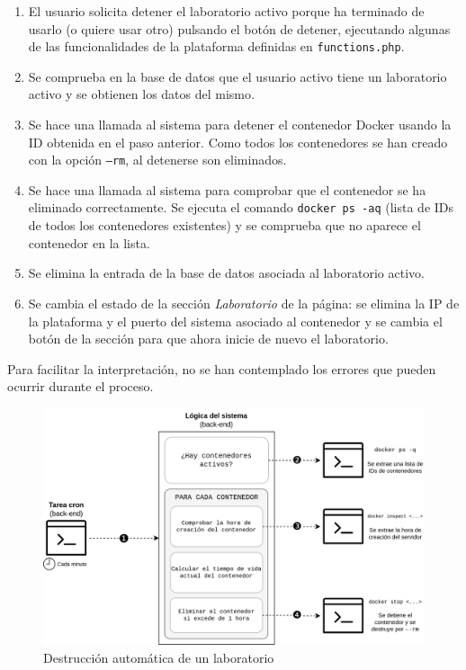             \begin{enumerate}
                \item El usuario solicita detener el laboratorio activo porque ha terminado de usarlo (o quiere usar otro) pulsando el botón de detener, ejecutando algunas de las funcionalidades de la plataforma definidas en \texttt{functions.php}.

                \item Se comprueba en la base de datos que el usuario activo tiene un laboratorio activo y se obtienen los datos del mismo.

                \item Se hace una llamada al sistema para detener el contenedor Docker usando la ID obtenida en el paso anterior. Como todos los contenedores se han creado con la opción \texttt{--rm}, al detenerse son eliminados.

                \item Se hace una llamada al sistema para comprobar que el contenedor se ha eliminado correctamente. Se ejecuta el comando \texttt{docker ps -aq} (lista de IDs de todos los contenedores existentes) y se comprueba que no aparece el contenedor en la lista.
                
                \item Se elimina la entrada de la base de datos asociada al laboratorio activo.

                \item Se cambia el estado de la sección \textit{Laboratorio} de la página: se elimina la IP de la plataforma y el puerto del sistema asociado al contenedor y se cambia el botón de la sección para que ahora inicie de nuevo el laboratorio.
                
            \end{enumerate}

            Para facilitar la interpretación, no se han contemplado los errores que pueden ocurrir durante el proceso.

            \newpage


            \begin{figure}
                \centering

                \includegraphics[scale=0.15]{images/Diagramas/detener-cron.png}
                \caption{Destrucción automática de un laboratorio}
                    \label{fig:detener-cron-laboratorio}
            \end{figure}

